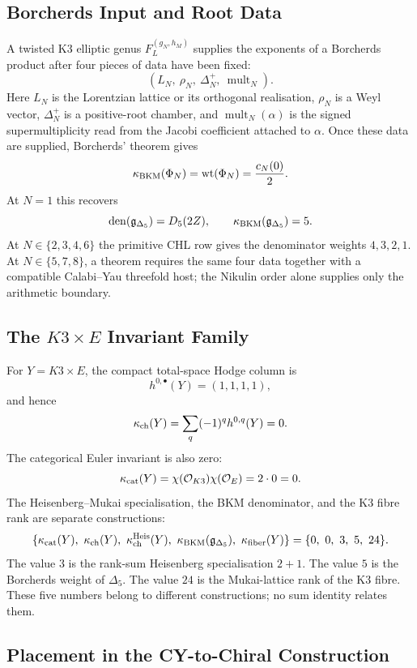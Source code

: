 \subsection*{Borcherds Input and Root Data}
\label{sec:frontier-borcherds-input}

A twisted K3 elliptic genus \(F^{(g_N,h_M)}_L\) supplies the exponents
of a Borcherds product after four pieces of data have been fixed:
\[
        (L_N,\ \rho_N,\ \Delta^+_N,\ \operatorname{mult}_N).
\]
Here \(L_N\) is the Lorentzian lattice or its orthogonal realisation,
\(\rho_N\) is a Weyl vector, \(\Delta^+_N\) is a positive-root chamber,
and \(\operatorname{mult}_N(\alpha)\) is the signed supermultiplicity
read from the Jacobi coefficient attached to \(\alpha\).  Once these
data are supplied, Borcherds' theorem gives
\[
        \kappa_{\mathrm{BKM}}(\Phi_N)=\mathrm{wt}(\Phi_N)=\frac{c_N(0)}{2}.
\]
At \(N=1\) this recovers
\[
        \operatorname{den}(\mathfrak{g}_{\Delta_5})=D_5(2Z),\qquad
        \kappa_{\mathrm{BKM}}(\mathfrak{g}_{\Delta_5})=5 .
\]
At \(N\in\{2,3,4,6\}\) the primitive CHL row gives the denominator
weights \(4,3,2,1\).  At \(N\in\{5,7,8\}\), a theorem requires the
same four data together with a compatible Calabi--Yau threefold host;
the Nikulin order alone supplies only the arithmetic boundary.

\subsection*{The \(K3\times E\) Invariant Family}
\label{sec:frontier-k3xe-invariants}

For \(Y=K3\times E\), the compact total-space Hodge column is
\[
        h^{0,\bullet}(Y)=(1,1,1,1),
\]
and hence
\[
        \kappa_{\mathrm{ch}}(Y)=\sum_q(-1)^q h^{0,q}(Y)=0 .
\]
The categorical Euler invariant is also zero:
\[
        \kappa_{\mathrm{cat}}(Y)=\chi(\mathcal{O}_{K3})\chi(\mathcal{O}_E)=2\cdot0=0 .
\]
The Heisenberg--Mukai specialisation, the BKM denominator, and the K3
fibre rank are separate constructions:
\[
 \{\kappa_{\mathrm{cat}}(Y),\ \kappa_{\mathrm{ch}}(Y),\ \kappa_{\mathrm{ch}}^{\mathrm{Heis}}(Y),\
   \kappa_{\mathrm{BKM}}(\mathfrak{g}_{\Delta_5}),\ \kappa_{\mathrm{fiber}}(Y)\}
 =
 \{0,\ 0,\ 3,\ 5,\ 24\}.
\]
The value \(3\) is the rank-sum Heisenberg specialisation \(2+1\).
The value \(5\) is the Borcherds weight of \(\Delta_5\).
The value \(24\) is the Mukai-lattice rank
of the K3 fibre.  These five numbers belong to different
constructions; no sum identity relates them.

\subsection*{Placement in the CY-to-Chiral Construction}
\label{sec:frontier-cy-to-chiral-placement}

